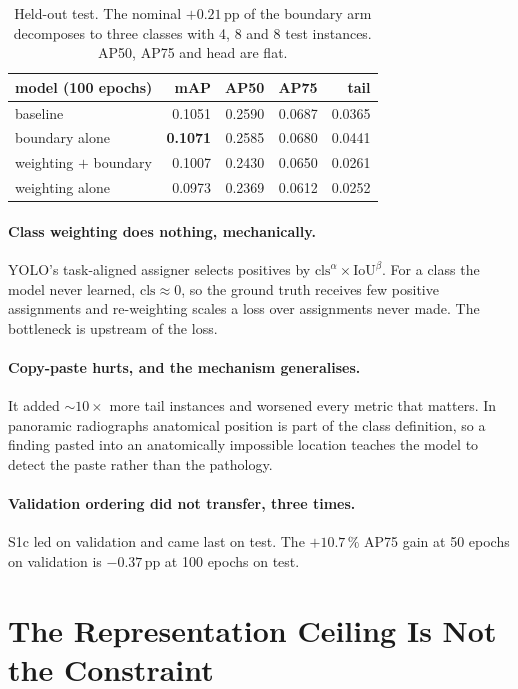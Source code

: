 \documentclass[11pt,letterpaper]{article}
\begin{document}
\begin{table}[h]
\centering\small
\begin{tabular}{lrrrr}
\toprule
model (100 epochs) & mAP & AP50 & AP75 & tail \\
\midrule
baseline & 0.1051 & 0.2590 & 0.0687 & 0.0365 \\
boundary alone & \textbf{0.1071} & 0.2585 & 0.0680 & 0.0441 \\
weighting $+$ boundary & 0.1007 & 0.2430 & 0.0650 & 0.0261 \\
weighting alone & 0.0973 & 0.2369 & 0.0612 & 0.0252 \\
\bottomrule
\end{tabular}
\caption{Held-out test. The nominal $+0.21$\,pp of the boundary arm decomposes
to three classes with 4, 8 and 8 test instances. AP50, AP75 and head are flat.}
\end{table}

\paragraph{Class weighting does nothing, mechanically.}
YOLO's task-aligned assigner selects positives by
$\mathrm{cls}^{\alpha}\!\times\!\mathrm{IoU}^{\beta}$. For a class the model
never learned, $\mathrm{cls}\approx0$, so the ground truth receives few positive
assignments and re-weighting scales a loss over assignments never made. The
bottleneck is upstream of the loss.

\paragraph{Copy-paste hurts, and the mechanism generalises.}
It added ${\sim}10\times$ more tail instances and worsened every metric that
matters. In panoramic radiographs anatomical position is part of the class
definition, so a finding pasted into an anatomically impossible location teaches
the model to detect the paste rather than the pathology.

\paragraph{Validation ordering did not transfer, three times.}
S1c led on validation and came last on test. The $+10.7\,\%$ AP75 gain at 50
epochs on validation is $-0.37$\,pp at 100 epochs on test.

\section{The Representation Ceiling Is Not the Constraint}
\label{sec:ceiling}
\end{document}
